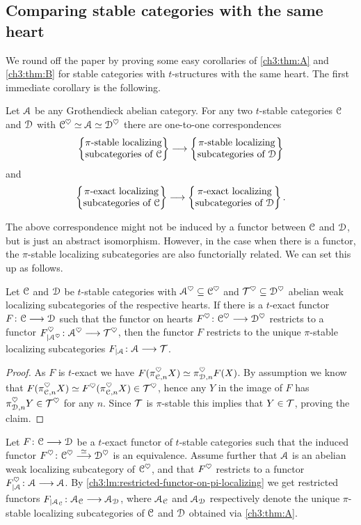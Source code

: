 \subsection{Comparing stable categories with the same heart}

We round off the paper by proving some easy corollaries of \cref{ch3:thm:A} and \cref{ch3:thm:B} for stable categories with $t$-structures with the same heart. The first immediate corollary is the following. 

\begin{corollary}
    Let $\A$ be any Grothendieck abelian category. For any two $t$-stable categories $\C$ and $\D$ with $\C^\heart \simeq \A\simeq \D^\heart$ there are one-to-one correspondences
    \[\pistable\to\pistableD\]
    and 
    \[\piexact\to \piexactD.\]
\end{corollary}

The above correspondence might not be induced by a functor between $\C$ and $\D$, but is just an abstract isomorphism. However, in the case when there is a functor, the $\pi$-stable localizing subcategories are also functorially related. We can set this up as follows. 

\begin{lemma}
    \label{ch3:lm:restricted-functor-on-pi-localizing}
    Let $\C$ and $\D$ be $t$-stable categories with $\A^\heart\subseteq \C^\heart$ and $\T^\heart\subseteq \D^\heart$ abelian weak localizing subcategories of the respective hearts. 
    If there is a $t$-exact functor $F\:\C\to \D$ such that the functor on hearts $F^\heart\: \C^\heart\to \D^\heart$ restricts to a functor $F^\heart_{\vert \A^\heart}\: \A^\heart \to \T^\heart$, then the functor $F$ restricts to the unique $\pi$-stable localizing subcategories $F_{\vert \A}\:\A\to \T$. 
\end{lemma}
\begin{proof}
    As $F$ is $t$-exact we have $F(\pi_{\C,n}^\heart X)\simeq \pi_{\D, n}^\heart F(X)$. By assumption we know that $F(\pi_{\C,n}^{\heart}X) \simeq F^\heart(\pi_{\C,n}^\heart X) \in \T^\heart$, hence any $Y$ in the image of $F$ has $\pi_{\D,n}^\heart Y \in \T^\heart$ for any $n$. Since $\T$ is $\pi$-stable this implies that $Y\in \T$, proving the claim.
\end{proof}

Let $F\:\C\to\D$ be a $t$-exact functor of $t$-stable categories such that the induced functor $F^\heart \: \C^\heart\overset{\simeq}\to \D^\heart$ is an equivalence. Assume further that $\A$ is an abelian weak localizing subcategory of $\C^\heart$, and that $F^\heart$ restricts to a functor $F^\heart_{\vert \A}\:\A\to\A$. By \cref{ch3:lm:restricted-functor-on-pi-localizing} we get restricted functors $F_{\vert \A_\C}\: \A_\C \to \A_\D$, where $\A_\C$ and $\A_\D$ respectively denote the unique $\pi$-stable localizing subcategories of $\C$ and $\D$ obtained via \cref{ch3:thm:A}.

